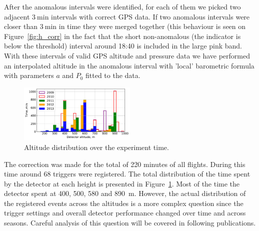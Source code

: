 \documentclass[universe,article,submit,moreauthors,pdftex]{Definitions/mdpi}
\begin{document}
\begin{paracol}{2}
After the anomalous intervals were identified, for each of them we picked two adjacent $3~\textrm{min}$ intervals with correct GPS data. If two anomalous intervals were closer than $3~\textrm{min}$ in time they were merged together (this behaviour is seen on Figure~\ref{fig:h_corr} in the fact that the short non-anomalous (the indicator is below the threshold) interval around 18:40 is included in the large pink band. With these intervals of valid GPS altitude and pressure data we have performed an interpolated altitude in the anomalous interval with 'local' barometric formula with parameters $a$ and $P_0$ fitted to the data.

\begin{figure}[tb]
    \includegraphics[width=0.5\textwidth]{figs/time_on_altitude_c.pdf}%
    \caption{Altitude distribution over the experiment time.}
    \label{fig:time_on_altitude}
\end{figure}

The correction was made for the total of 220 minutes of all flights. During this time around 68 triggers were registered. The total distribution of the time spent by the detector at each height is presented in Figure~\ref{fig:time_on_altitude}. Most of the time the detector spent at 400, 500, 580 and 890~m. However, the actual distribution of the registered events across the altitudes is a more complex question since the trigger settings and overall detector performance changed over time and across seasons. Careful analysis of this question will be covered in following publications.




\end{paracol}
\end{document}
